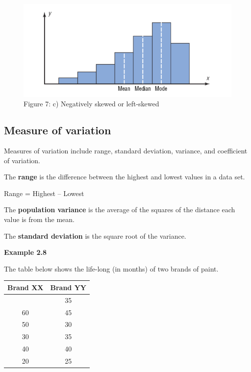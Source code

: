 \documentclass[
  a4paper,
  DIV=11,
  numbers=noendperiod,
  oneside]{scrreprt}
\begin{document}
\begin{figure}

{\centering \includegraphics[width=5.20833in,height=\textheight]{images/ch2/picture12.png}

}

\caption{Figure 7: c) Negatively skewed or left-skewed}

\end{figure}

\hypertarget{measure-of-variation}{%
\subsection{Measure of variation}\label{measure-of-variation}}

Measures of variation include range, standard deviation, variance, and
coefficient of variation.

The \textbf{range} is the difference between the highest and lowest
values in a data set.

Range = Highest -- Lowest

The \textbf{population variance} is the average of the squares of the
distance each value is from the mean.

The \textbf{standard deviation} is the square root of the variance.

{\textbf{Example 2.8}}

The table below shows the life-long (in months) of two brands of paint.

\begin{longtable}[]{@{}cc@{}}
\toprule\noalign{}
Brand XX & Brand YY \\
\midrule\noalign{}
\endhead
\bottomrule\noalign{}
\endlastfoot
10 & 35 \\
60 & 45 \\
50 & 30 \\
30 & 35 \\
40 & 40 \\
20 & 25 \\
\end{longtable}
\end{document}
